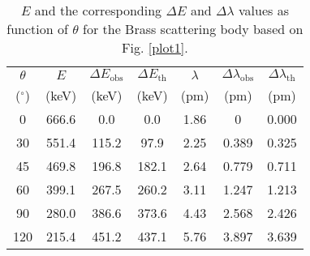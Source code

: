 \begin{table}[H]
    \centering
    \begin{tabular}{|c|c|c|c|c|c|c|}
    \hline
    $\theta$ & $E$ & $\Delta E_\text{obs}$ & $\Delta E_\text{th}$ & $\lambda$ & $\Delta \lambda_\text{obs}$ & $\Delta \lambda_\text{th}$ \\
    ($^\circ$) & (keV) & (keV) & (keV) & (pm) & (pm) & (pm) \\ \hline
    0 & 666.6 & 0.0 & 0.0 & 1.86 & 0 & 0.000 \\ \hline
    30 & 551.4 & 115.2 & 97.9 & 2.25 & 0.389 & 0.325 \\ \hline
    45 & 469.8 & 196.8 & 182.1 & 2.64 & 0.779 & 0.711 \\ \hline
    60 & 399.1 & 267.5 & 260.2 & 3.11 & 1.247 & 1.213 \\ \hline
    90 & 280.0 & 386.6 & 373.6 & 4.43 & 2.568 & 2.426 \\ \hline
    120 & 215.4 & 451.2 & 437.1 & 5.76 & 3.897 & 3.639 \\ \hline
    \end{tabular}
    \caption{$E$ and the corresponding $\Delta E$ and $\Delta \lambda$ values as function of $\theta$ for the Brass scattering body based on Fig. \ref{plot1}.}
    \label{tab:2}
\end{table}